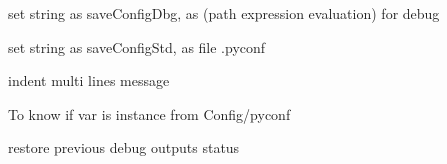 \documentclass[a4paper,10pt,english]{sphinxmanual}
\begin{document}

\begin{fulllineitems}
\label{\detokenize{apidoc_src/src:src.debug.getStrConfigDbg}}
set string as saveConfigDbg, 
as (path expression evaluation) for debug

\end{fulllineitems}


\begin{fulllineitems}
\label{\detokenize{apidoc_src/src:src.debug.getStrConfigStd}}
set string as saveConfigStd, 
as file .pyconf

\end{fulllineitems}


\begin{fulllineitems}
\label{\detokenize{apidoc_src/src:src.debug.indent}}
indent multi lines message

\end{fulllineitems}


\begin{fulllineitems}
\label{\detokenize{apidoc_src/src:src.debug.isTypeConfig}}
To know if var is instance from Config/pyconf

\end{fulllineitems}


\begin{fulllineitems}
\label{\detokenize{apidoc_src/src:src.debug.pop_debug}}
restore previous debug outputs status

\end{fulllineitems}
\end{document}
